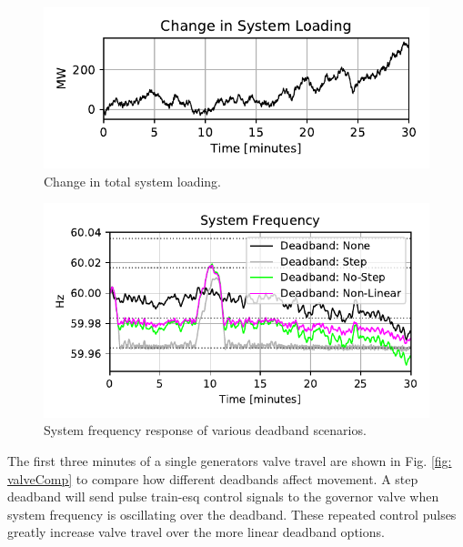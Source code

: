 \begin{figure}[!ht]
\centering
\includegraphics[width=\linewidth]{figures/miniWECCuniAccPloadChange}
\caption{Change in total system loading.}
\label{fig: systemLoading}
\end{figure}

\begin{figure}[!ht]
\centering
\includegraphics[width=\linewidth]{figures/miniWECCnoiseNLdroopDBFreq}
\caption{System frequency response of various deadband scenarios.}
\label{fig: sysFreqDB}
\end{figure}

The first three minutes of a single generators valve travel are shown in Fig. \ref{fig: valveComp} to compare how different deadbands affect movement.
A step deadband will send pulse train-esq control signals to the governor valve when system frequency is oscillating over the deadband. 
These repeated control pulses greatly increase valve travel over the more linear deadband options.

